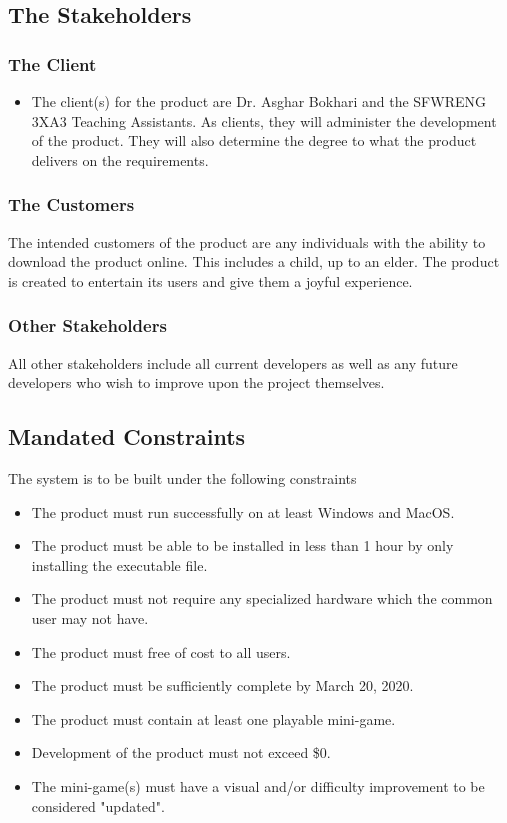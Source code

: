 \documentclass[12pt, titlepage]{article}
\begin{document}
\subsection{The Stakeholders}

\subsubsection{The Client}

\begin{itemize}
    \item The client(s) for the product are Dr. Asghar Bokhari and the SFWRENG 3XA3 Teaching Assistants. As clients, they will administer the development of the product. They will also determine the degree to what the product delivers on the requirements.
\end{itemize}

\subsubsection{The Customers}

The intended customers of the product are any individuals with the ability to download the product online. This includes a child, up to an elder. The product is created to entertain its users and give them a joyful experience.

\subsubsection{Other Stakeholders}

All other stakeholders include all current developers as well as any future developers who wish to improve upon the project themselves.

\subsection{Mandated Constraints}

The system is to be built under the following constraints

\begin{itemize}
    \item The product must run successfully on at least Windows and MacOS.
    \item The product must be able to be installed in less than 1 hour by only installing the executable file.
    \item The product must not require any specialized hardware which the common user may not have.
    \item The product must free of cost to all users.
    \item The product must be sufficiently complete by March 20, 2020.
    \item The product must contain at least one playable mini-game.
    \item Development of the product must not exceed \$0.
    \item The mini-game(s) must have a visual and/or difficulty improvement to be considered "updated".
\end{itemize}
\end{document}
